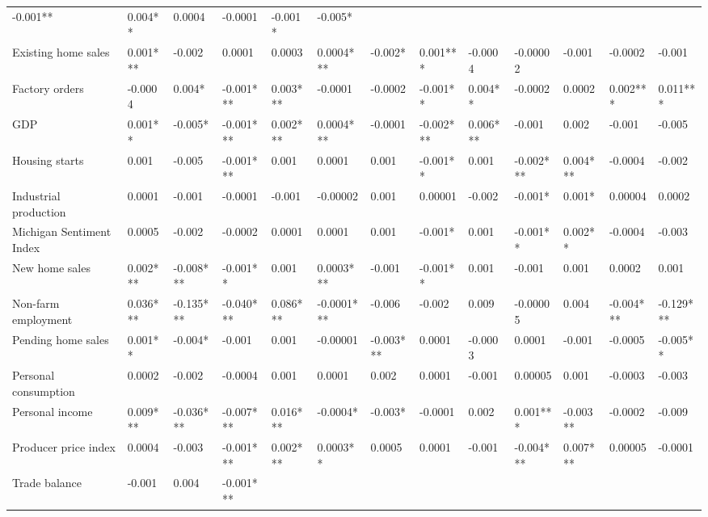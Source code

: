 \begin{landscape}
\begin{table}[]
{\begin{tabular}{lllllllllllll}
  -0.001** &
  0.004** &
  0.0004 &
  -0.0001 &
  -0.001* &
  -0.005* \\
Existing home sales &
  0.001*** &
  -0.002 &
  0.0001 &
  0.0003 &
  0.0004*** &
  -0.002* &
  0.001*** &
  -0.0004 &
  -0.00002 &
  -0.001 &
  -0.0002 &
  -0.001 \\
Factory orders &
  -0.0004 &
  0.004* &
  -0.001*** &
  0.003*** &
  -0.0001 &
  -0.0002 &
  -0.001** &
  0.004** &
  -0.0002 &
  0.0002 &
  0.002*** &
  0.011*** \\
GDP &
  0.001** &
  -0.005* &
  -0.001*** &
  0.002*** &
  0.0004*** &
  -0.0001 &
  -0.002*** &
  0.006*** &
  -0.001 &
  0.002 &
  -0.001 &
  -0.005 \\
Housing starts &
  0.001 &
  -0.005 &
  -0.001*** &
  0.001 &
  0.0001 &
  0.001 &
  -0.001** &
  0.001 &
  -0.002*** &
  0.004*** &
  -0.0004 &
  -0.002 \\
Industrial production &
  0.0001 &
  -0.001 &
  -0.0001 &
  -0.001 &
  -0.00002 &
  0.001 &
  0.00001 &
  -0.002 &
  -0.001* &
  0.001* &
  0.00004 &
  0.0002 \\
Michigan Sentiment Index &
  0.0005 &
  -0.002 &
  -0.0002 &
  0.0001 &
  0.0001 &
  0.001 &
  -0.001* &
  0.001 &
  -0.001** &
  0.002** &
  -0.0004 &
  -0.003 \\
New home sales &
  0.002*** &
  -0.008*** &
  -0.001** &
  0.001 &
  0.0003*** &
  -0.001 &
  -0.001** &
  0.001 &
  -0.001 &
  0.001 &
  0.0002 &
  0.001 \\
Non-farm employment &
  0.036*** &
  -0.135*** &
  -0.040*** &
  0.086*** &
  -0.0001*** &
  -0.006 &
  -0.002 &
  0.009 &
  -0.00005 &
  0.004 &
  -0.004*** &
  -0.129*** \\
Pending home sales &
  0.001** &
  -0.004* &
  -0.001 &
  0.001 &
  -0.00001 &
  -0.003*** &
  0.0001 &
  -0.0003 &
  0.0001 &
  -0.001 &
  -0.0005 &
  -0.005** \\
Personal consumption &
  0.0002 &
  -0.002 &
  -0.0004 &
  0.001 &
  0.0001 &
  0.002 &
  0.0001 &
  -0.001 &
  0.00005 &
  0.001 &
  -0.0003 &
  -0.003 \\
Personal income &
  0.009*** &
  -0.036*** &
  -0.007*** &
  0.016*** &
  -0.0004* &
  -0.003* &
  -0.0001 &
  0.002 &
  0.001*** &
  -0.003** &
  -0.0002 &
  -0.009 \\
Producer price index &
  0.0004 &
  -0.003 &
  -0.001*** &
  0.002*** &
  0.0003** &
  0.0005 &
  0.0001 &
  -0.001 &
  -0.004*** &
  0.007*** &
  0.00005 &
  -0.0001 \\
Trade balance &
  -0.001 &
  0.004 &
  -0.001*** &

\end{tabular}}
\end{table}
\end{landscape}
